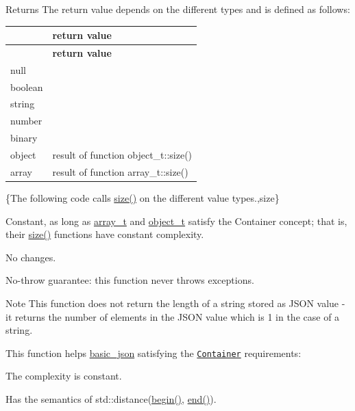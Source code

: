 \begin{DoxyReturn}{Returns}
The return value depends on the different types and is defined as follows\+: \tabulinesep=1mm
\begin{longtabu} spread 0pt [c]{*2{|X[-1]}|}
\hline
{}&{\bf return value  }\\
\endfirsthead
\hline
\endfoot
\hline
{}&{\bf return value  }\\
\endhead
null &{} \\
boolean &{} \\
string &{} \\
number &{} \\
binary &{} \\
object &result of function object\+\_\+t\+::size() \\
array &result of function array\+\_\+t\+::size() \\
\end{longtabu}
\{The following code calls {\ttfamily \hyperlink{classnlohmann_1_1basic__json_a33c7c8638bb0b12e6d1b69d8106dd2e0}{size()}} on the different value types.,size\}
\end{DoxyReturn}
Constant, as long as \hyperlink{classnlohmann_1_1basic__json_a53700c308d804f84aea5ff05abb2ac4e}{array\+\_\+t} and \hyperlink{classnlohmann_1_1basic__json_a5e3df077f880583a96d74cd63e173cb2}{object\+\_\+t} satisfy the Container concept; that is, their \hyperlink{classnlohmann_1_1basic__json_a33c7c8638bb0b12e6d1b69d8106dd2e0}{size()} functions have constant complexity.

No changes.

No-\/throw guarantee\+: this function never throws exceptions.

\begin{DoxyNote}{Note}
This function does not return the length of a string stored as J\+S\+ON value -\/ it returns the number of elements in the J\+S\+ON value which is 1 in the case of a string.
\end{DoxyNote}
This function helps {\ttfamily \hyperlink{classnlohmann_1_1basic__json}{basic\+\_\+json}} satisfying the \href{https://en.cppreference.com/w/cpp/named_req/Container}{\tt Container} requirements\+:
\begin{DoxyItemize}
\item The complexity is constant.
\item Has the semantics of {\ttfamily std\+::distance(\hyperlink{classnlohmann_1_1basic__json_a23b495b4c282e4afacf382f5b49af7c7}{begin()}, \hyperlink{classnlohmann_1_1basic__json_a931267ec3f09eb67e4382f321b2c52bc}{end()})}.
\end{DoxyItemize}

